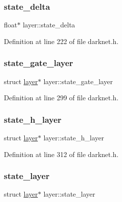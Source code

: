 \mbox{\label{structlayer_a48c287c5df2e2cd3bea497e6a93487a6}} 
\subsubsection{\texorpdfstring{state\_delta}{state\_delta}}
{\footnotesize\ttfamily float$\ast$ layer\+::state\+\_\+delta}



Definition at line 222 of file darknet.\+h.

\mbox{\label{structlayer_a0b1b6cbee3d9421055512d52d8291929}} 
\subsubsection{\texorpdfstring{state\_gate\_layer}{state\_gate\_layer}}
{\footnotesize\ttfamily struct \mbox{\hyperlink{structlayer}{layer}}$\ast$ layer\+::state\+\_\+gate\+\_\+layer}



Definition at line 299 of file darknet.\+h.

\mbox{\label{structlayer_a8d566da721348636889c3f9aadd6f5e0}} 
\subsubsection{\texorpdfstring{state\_h\_layer}{state\_h\_layer}}
{\footnotesize\ttfamily struct \mbox{\hyperlink{structlayer}{layer}}$\ast$ layer\+::state\+\_\+h\+\_\+layer}



Definition at line 312 of file darknet.\+h.

\mbox{\label{structlayer_ac79543fef7f4662508f07bc68483a78f}} 
\subsubsection{\texorpdfstring{state\_layer}{state\_layer}}
{\footnotesize\ttfamily struct \mbox{\hyperlink{structlayer}{layer}}$\ast$ layer\+::state\+\_\+layer}



